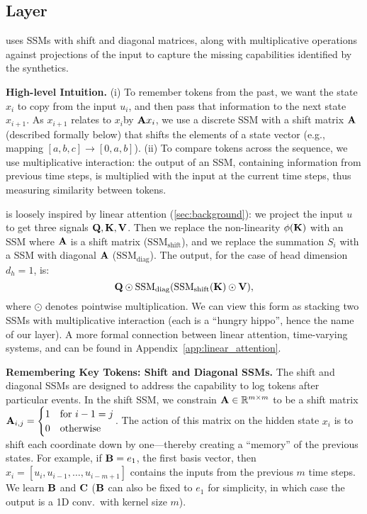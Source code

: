 \subsection{\hthree Layer\label{sec:method_h3}}
\hthree uses SSMs with shift and diagonal matrices, along with multiplicative
operations against projections of the input to capture the missing capabilities identified by the synthetics.

\textbf{High-level Intuition.}
(i) To remember tokens from the past, we want the state $x_i$ to copy from the input $u_i$, and then pass that information to the next state $x_{i+1}$. As $x_{i+1}$ relates to $x_i$by $\mathbf{A} x_i$, we use a discrete SSM with a shift matrix $\mathbf{A}$ (described formally below) that shifts the elements of a state vector (e.g., mapping $[a, b, c] \to [0, a, b]$).
(ii) To compare tokens across the sequence, we use multiplicative interaction: the output of an SSM, containing information from previous time steps, is multiplied with the input at the current time steps, thus measuring similarity between tokens.

\hthree is loosely inspired by linear attention (\cref{sec:background}): we project the input $u$ to get three signals $\mathbf{Q}, \mathbf{K}, \mathbf{V}$.
Then we replace the non-linearity $\phi(\mathbf{K})$ with an SSM where $\mathbf{A}$ is a shift matrix ($\mathrm{SSM}_\mathrm{shift}$), and we replace the summation $S_i$ with a SSM with diagonal $\mathbf{A}$ ($\mathrm{SSM}_\mathrm{diag}$).
The output, for the case of head dimension $d_h = 1$, is:
\begin{equation*}
  \mathbf{Q} \odot \mathrm{SSM}_\mathrm{diag}(\mathrm{SSM}_\mathrm{shift}(\mathbf{K}) \odot \mathbf{V}),
\end{equation*}
where $\odot$ denotes pointwise multiplication.
We can view this form as stacking two SSMs with multiplicative
interaction (each is a ``hungry hippo'', hence the name of our layer).
A more formal connection between linear attention, time-varying systems, and \hthree can be found in Appendix~\ref{app:linear_attention}.

\textbf{Remembering Key Tokens: Shift and Diagonal SSMs.}
The shift and diagonal SSMs are designed to address the capability to log tokens after particular events.
In the shift SSM, we constrain $\mathbf{A} \in \mathbb{R}^{m \times m}$ to be a shift matrix
$
\mathbf{A}_{i, j} = 
    \begin{cases}
    1 & \text{for } i - 1 = j\\
    0 & \text{otherwise}
    \end{cases}
$.
The action of this matrix on the hidden state $x_i$ is to shift each coordinate
down by one---thereby creating a ``memory'' of the previous states.
For example, if $\mathbf{B} = e_1$, the first basis vector, then
$x_i = [u_i, u_{i-1}, \dots, u_{i-m+1}]$ contains the inputs from the previous $m$
time steps.
We learn $\mathbf{B}$ and $\mathbf{C}$ ($\mathbf{B}$ can also be fixed to $e_1$ for
simplicity, in which case the output is a 1D conv.\ with kernel size $m$).

